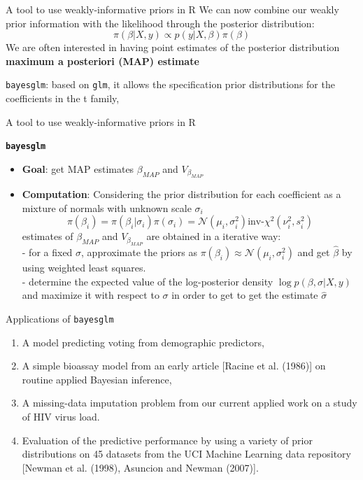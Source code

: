 \documentclass{beamer}
\begin{document}
\begin{frame}{A tool to use weakly-informative priors in R}
	We can now combine our weakly prior information with the likelihood through the posterior distribution: $$ \pi(\beta| X, y) \propto  p(y | X, \beta) \pi(\beta)$$
	We are often interested in having point estimates of the posterior distribution \textrightarrow \textbf{maximum a posteriori (MAP) estimate}
	
	\texttt{bayesglm}: based on \texttt{glm}, it allows the specification prior distributions for the coefficients in the t family,
\end{frame}

\begin{frame}{A tool to use weakly-informative priors in R}
	
		\centering
		\textbf{\texttt{bayesglm}}\\
		\vspace{0.2cm}
		\begin{itemize}
			\item \textbf{Goal}: \small get MAP estimates $\beta_{MAP}$ and $V_{\beta_{MAP}}$
			\item \textbf{Computation}: \small {Considering the prior distribution for each coefficient as a mixture of normals with unknown scale $\sigma_i$}  $$\pi(\beta_i) = \pi(\beta_i|\sigma_i) \pi(\sigma_i) = \mathcal{N}(\mu_i, \sigma_i^2) \text{inv-}\chi^2(\nu^2_i, s^2_i)$$
			estimates of $\beta_{MAP}$ and $V_{\beta_{MAP}}$ are obtained in a iterative way: \\
			\vspace{0.2cm}
			- for a fixed $\sigma$, approximate the priors as $\pi(\beta_i) \approx \mathcal{N}(\mu_i, \sigma_i^2)$ and get $\hat{\beta}$ by using weighted least squares. \\
			- determine the expected value of the log-posterior density $\log p(\beta, \sigma | X, y)$ and maximize it with respect to $\sigma$ in order to get to get the estimate $\hat{\sigma}$
		\end{itemize}
		
\end{frame}


\begin{frame}{Applications of \texttt{bayesglm}}
	\begin{enumerate}
		\item A model predicting voting from demographic predictors,
		\item A simple bioassay model from an early article [Racine et al. (1986)] on routine applied Bayesian inference,
		\item A missing-data imputation problem from our current applied work on a study of HIV virus load.
		\item Evaluation of the predictive
		performance by using a variety of prior distributions on 45 datasets from the UCI Machine Learning data repository [Newman et al. (1998), Asuncion and Newman (2007)].
	\end{enumerate}
\end{frame}
\end{document}
